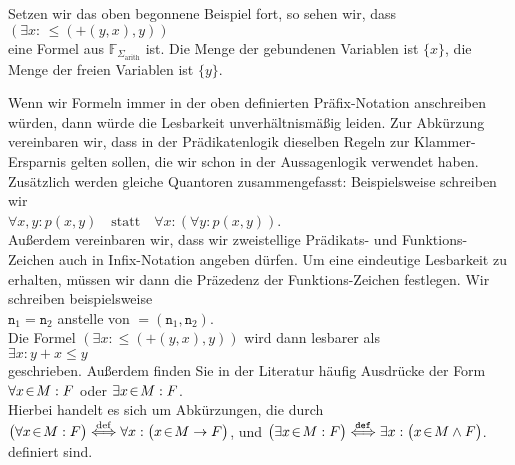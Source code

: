 \example
Setzen wir das oben begonnene Beispiel fort, so  sehen wir, dass \\[0.2cm]
\hspace*{1.3cm} $(\exists x \colon\, \leq\!(\mathtt{+}(y, x),y))$ \\[0.2cm]
eine Formel aus $\mathbb{F}_{\Sigma_{\mathrm{arith}}}$ ist. 
Die Menge der gebundenen Variablen ist $\{x\}$, die Menge der freien Variablen ist 
$\{ y \}$. \eox

Wenn wir Formeln immer in der oben definierten Präfix-Notation anschreiben würden, dann würde die Lesbarkeit unverhältnismäßig leiden. 
Zur Abkürzung vereinbaren wir, dass in der Prä\-dikatenlogik dieselben Regeln zur Klammer-Ersparnis
gelten sollen,  die wir schon in der Aussagenlogik verwendet haben.  Zusätzlich werden
gleiche Quantoren zusammengefasst: Beispielsweise schreiben wir  
\\[0.2cm]
\hspace*{1.3cm}
$\forall x, y \colon p(x, y)  \quad \mathrm{statt} \quad \forall x \colon ( \forall y \colon p(x,y))$.
\\[0.2cm]
Außerdem vereinbaren wir, dass wir zweistellige Prädikats- und Funktions-Zeichen auch in Infix-Notation angeben
dürfen.  Um eine eindeutige Lesbarkeit zu erhalten, müssen wir dann die Präzedenz der Funktions-Zeichen
festlegen.  Wir schreiben beispielsweise \\[0.2cm]
\hspace*{1.3cm} $\mathtt{n}_1 = \mathtt{n}_2$  \quad anstelle von \quad $=(\mathtt{n}_1, \mathtt{n}_2)$. \\[0.2cm]
Die Formel $(\exists x \colon \leq(\mathtt{+}(y, x),y))$ wird dann lesbarer als \\[0.2cm]
\hspace*{1.3cm} $\exists x \colon y + x \leq y$ \\[0.2cm]
geschrieben.  Außerdem finden Sie in der Literatur häufig Ausdrücke der Form
\\[0.2cm]
\hspace*{1.3cm}
$\forall x\!\in\! M: F$ \quad oder \quad $\exists x\!\in\! M: F$.
\\[0.2cm]
Hierbei handelt es sich um Abkürzungen, die durch
\\[0.2cm]
\hspace*{1.3cm}
$\displaystyle \bigl(\forall x\!\in\! M: F\bigr) \stackrel{\mathrm{def}}{\Longleftrightarrow} \forall x: \bigl(x \!\in\! M \rightarrow F\bigr)$,
\quad und \quad 
$\displaystyle\bigl(\exists x\!\in\! M: F\bigr) \stackrel{\mathtt{def}}{\Longleftrightarrow} \exists x: \bigl(x \!\in\! M \wedge F\bigr)$.
\\[0.2cm]
definiert sind.

